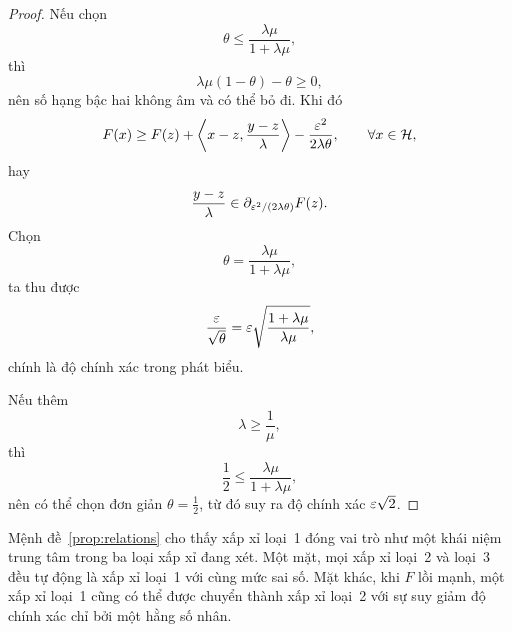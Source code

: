 \begin{essayonly}
\begin{proof}
Nếu chọn
\[
\theta
\le
\frac{\lambda\mu}{1+\lambda\mu},
\]
thì
\[
\lambda\mu(1-\theta)-\theta\ge0,
\]
nên số hạng bậc hai không âm và có thể bỏ đi. Khi đó
\[
F(x)
\ge
F(z)
+
\left\langle
x-z,
\frac{y-z}{\lambda}
\right\rangle
-
\frac{\varepsilon^2}{2\lambda\theta},
\qquad
\forall x\in\mathcal{H},
\]
hay
\[
\frac{y-z}{\lambda}
\in
\partial_{\varepsilon^2/(2\lambda\theta)}F(z).
\]
Chọn
\[
\theta
=
\frac{\lambda\mu}{1+\lambda\mu},
\]
ta thu được
\[
\frac{\varepsilon}{\sqrt{\theta}}
=
\varepsilon
\sqrt{\frac{1+\lambda\mu}{\lambda\mu}},
\]
chính là độ chính xác trong phát biểu.

Nếu thêm
\[
\lambda\ge\frac1\mu,
\]
thì
\[
\frac12
\le
\frac{\lambda\mu}{1+\lambda\mu},
\]
nên có thể chọn đơn giản $\theta=\frac12$, từ đó suy ra độ chính xác
$\varepsilon\sqrt2$.

\end{proof}
\end{essayonly}

\begin{essayonly}
Mệnh đề~\ref{prop:relations} cho thấy xấp xỉ loại~1 đóng vai trò như một khái niệm trung tâm trong ba loại xấp xỉ đang xét. Một mặt, mọi xấp xỉ loại~2 và loại~3 đều tự động là xấp xỉ loại~1 với cùng mức sai số. Mặt khác, khi $F$ lồi mạnh, một xấp xỉ loại~1 cũng có thể được chuyển thành xấp xỉ loại~2 với sự suy giảm độ chính xác chỉ bởi một hằng số nhân.
\end{essayonly} 

